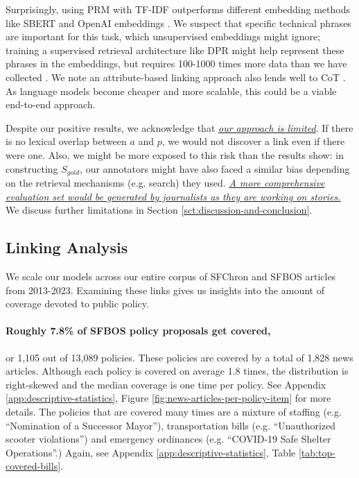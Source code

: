 \documentclass[11pt]{article}
\begin{document}
Surprisingly, using PRM with TF-IDF outperforms different embedding methods like SBERT \cite{reimers2019sentence} and OpenAI embeddings \cite{openaiembeddings}. We suspect that specific technical phrases are important for this task, which unsupervised embeddings might ignore; training a supervised retrieval architecture like DPR might help represent these phrases in the embeddings, but requires 100-1000 times more data than we have collected \cite{karpukhin2020dense}. 
We note an attribute-based linking approach also lends well to CoT \cite{wei2022chain}. As language models become cheaper and more scalable, this could be a viable end-to-end approach.

Despite our positive results, we acknowledge that \textit{\ul{our approach is limited}}. If there is no lexical overlap between $a$ and $p$, we would not discover a link even if there were one. Also, we might be more exposed to this risk than the results show: in constructing $S_{gold}$, our annotators might have also faced a similar bias depending on the retrieval mechanisms (e.g. search) they used. \textit{\ul{A more comprehensive evaluation set would be generated by journalists \textit{as they are working} on stories.}} We discuss further limitations in Section \ref{sct:discussion-and-conclusion}.

\subsection{Linking Analysis}
\label{sct:sct-1:analysis}
We scale our models across our entire corpus of SFChron and SFBOS articles from 2013-2023. Examining these links gives us insights into the amount of coverage devoted to public policy.

\paragraph{Roughly 7.8\% of SFBOS policy proposals get covered,} or 1,105 out of 13,089 policies. These policies are covered by a total of 1,828 news articles. Although each policy is covered on average 1.8 times, the distribution is right-skewed and the median coverage is one time per policy. See Appendix \ref{app:descriptive-statistics}, Figure \ref{fig:news-articles-per-policy-item} for more details. The policies that are covered many times are a mixture of staffing (e.g. ``Nomination of a Successor Mayor''), transportation bills (e.g. ``Unauthorized scooter violations'') and emergency ordinances (e.g. ``COVID-19 Safe Shelter Operations''.) Again, see Appendix \ref{app:descriptive-statistics}, Table \ref{tab:top-covered-bills}.
\end{document}
